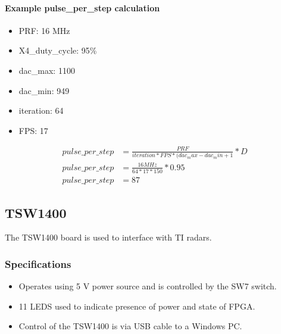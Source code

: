 \documentclass[letterpaper,10pt,english]{sphinxmanual}
\begin{document}
\paragraph{Example pulse\_per\_step calculation}
\label{\detokenize{Radar information:example-pulse-per-step-calculation}}\begin{itemize}
\item {} 
PRF: 16 MHz

\item {} 
X4\_duty\_cycle: 95\%

\item {} 
dac\_max: 1100

\item {} 
dac\_min: 949

\item {} 
iteration: 64

\item {} 
FPS: 17

\end{itemize}
\begin{equation*}
\begin{split}pulse\_per\_step &= \frac{PRF}{iteration*FPS*(dac_max-dac_min+1} * D \\
pulse\_per\_step  &= \frac{16 MHz}{64*17*150} * 0.95 \\
pulse\_per\_step  &= 87\end{split}
\end{equation*}

\subsection{TSW1400}
\label{\detokenize{Radar information:tsw1400}}
The TSW1400 board is used to interface with TI radars.


\subsubsection{Specifications}
\label{\detokenize{Radar information:id1}}\begin{itemize}
\item {} 
Operates using 5 V power source and is controlled by the SW7 switch.

\item {} 
11 LEDS used to indicate presence of power and state of FPGA.

\item {} 
Control of the TSW1400 is via USB cable to a Windows PC.

\end{itemize}
\end{document}
